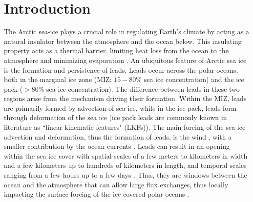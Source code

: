 \documentclass[lineno,sn-basic]{sn-jnl}%
\begin{document}


\maketitle

\section{Introduction}\label{sec1}

The Arctic sea-ice plays a crucial role in regulating Earth's climate by acting as a natural insulator between the atmosphere and the ocean below. This insulating property acts as a thermal barrier, limiting heat loss from the ocean to the atmosphere and minimizing evaporation \citep{Wettlaufer_insulator_1997, Untersteiner_ice_insulator_1961}. An ubiquitous feature of Arctic sea ice is the formation and persistence of leads. Leads occur across the polar oceans, both in the marginal ice zone (MIZ; $15-80\%$ sea ice concentration) and the ice pack ($>80\%$ sea ice concentration). The difference between leads in these two regions arise from the mechanism driving their formation. Within the MIZ, leads are primarily formed by advection of sea ice, while in the ice pack, leads form through deformation of the sea ice (ice pack leads are commonly known in literature as ``linear kinematic features" (LKFs)). 
The main forcing of the sea ice advection and deformation, thus the formation of leads, is the wind \citep{Linow_lkf_2017, Hutter_scaling_lkf_2018}, with a smaller contribution by the ocean currents \citep{Willmes_leads_currents_2023}.
Leads can result in an opening within the sea ice cover \citep{Rampal_nextsim_2016, Hutchings_model_lkf_2005, Richter_pack_stress_2002} with spatial scales of a few meters to kilometers in width and a few kilometers up to hundreds of kilometers in length, and temporal scales ranging from a few hours up to a few days \citep{Linow_lkf_2017, Wernecke_Lead_2015, Tschudi_obs_leads_1998}. Thus, they are windows between the ocean and the atmosphere that can allow large flux exchanges, thus locally impacting the surface forcing of the ice covered polar oceans \citep{Lupkes_leads_2008}.
\end{document}
